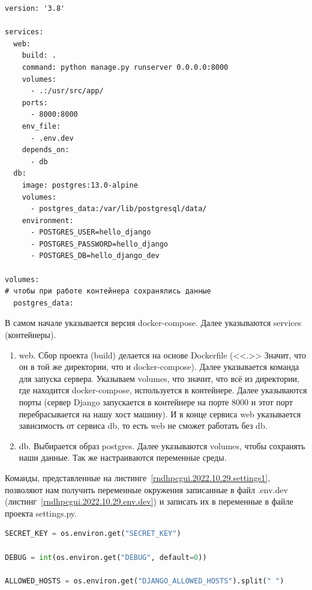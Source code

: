 \begin{lstlisting}[frame=single, label={rndhpcgui.2022.10.29.docker-compose}, caption={docker-compose.yml}, language={docker-compose}] 
version: '3.8'

services:
  web:
    build: .
    command: python manage.py runserver 0.0.0.0:8000
    volumes:
      - .:/usr/src/app/
    ports:
      - 8000:8000
    env_file:
      - .env.dev
    depends_on:
      - db
  db:
    image: postgres:13.0-alpine
    volumes:
      - postgres_data:/var/lib/postgresql/data/
    environment:
      - POSTGRES_USER=hello_django
      - POSTGRES_PASSWORD=hello_django
      - POSTGRES_DB=hello_django_dev

volumes:
# чтобы при работе контейнера сохранялись данные
  postgres_data:
\end{lstlisting}

В самом начале указывается версия \textsf{docker-compose}. Далее указываются \textsf{services} (контейнеры). 
\begin{enumerate}
	\item \textsf{web}. Сбор проекта (\textsf{build}) делается на основе \textsf{Dockerfile} (<<\textsf{.}>> Значит, что он в той же директории, что и \textsf{docker-compose}). Далее указывается команда для запуска сервера. Указываем \textsf{volumes}, что значит, что всё из директории, где находится \textsf{docker-compose}, используется в контейнере. Далее указываются порты (сервер \textsf{Django} запускается в контейнере на порте \textsf{8000} и этот порт перебрасывается на нашу хост машину). И в конце сервиса \textsf{web} указывается зависимость от сервиса \textsf{db}, то есть \textsf{web} не сможет работать без \textsf{db}.
	\item \textsf{db}. Выбирается образ \textsf{postgres}. Далее указываются volumes, чтобы сохранять наши данные. Так же настраиваются переменные среды.
\end{enumerate}
	
Команды, представленные на листинге~\ref{rndhpcgui.2022.10.29.settings1}, позволяют нам получить переменные окружения записанные в файл \textsf{.env.dev} (листинг~\ref{rndhpcgui.2022.10.29.env.dev}) и записать их в переменные в файле проекта \textsf{settings.py}.

\begin{lstlisting}[frame=single, label={rndhpcgui.2022.10.29.settings1}, caption={Обновлённые переменные в \textsf{settings.py}}, language=Python] 
SECRET_KEY = os.environ.get("SECRET_KEY")

DEBUG = int(os.environ.get("DEBUG", default=0))

ALLOWED_HOSTS = os.environ.get("DJANGO_ALLOWED_HOSTS").split(" ")
\end{lstlisting}

